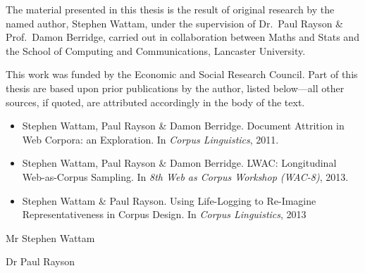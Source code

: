 The material presented in this thesis is the result of original research by the named author, Stephen Wattam, under the supervision of Dr.\ Paul Rayson \& Prof.\ Damon Berridge, carried out in collaboration between Maths and Stats and the School of Computing and Communications, Lancaster University.

This work was funded by the Economic and Social Research Council.  Part of this thesis are based upon prior publications by the author, listed below---all other sources, if quoted, are attributed accordingly in the body of the text.

\begin{itemize}
    \item Stephen Wattam, Paul Rayson \& Damon Berridge.  Document Attrition in Web Corpora: an Exploration.  In \textsl{Corpus Linguistics}, 2011.
    \item Stephen Wattam, Paul Rayson \& Damon Berridge.  LWAC: Longitudinal Web-as-Corpus Sampling.  In \textsl{8th Web as Corpus Workshop (WAC-8)}, 2013.
    \item Stephen Wattam \& Paul Rayson.  Using Life-Logging to Re-Imagine Representativeness in Corpus Design.  In \textsl{Corpus Linguistics}, 2013
\end{itemize}

\vspace{1in}
Mr Stephen Wattam \dotfill


\vspace{0.5in}
Dr Paul Rayson \dotfill






